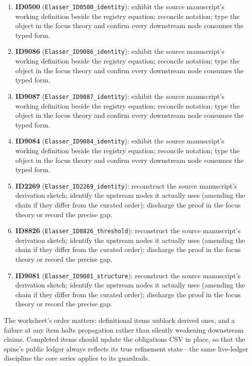 \documentclass[11pt]{article}
\theoremstyle{remark}
\begin{document}
\begin{enumerate}
\item \textbf{ID0500} (\texttt{Elasser\_ID0500\_identity}): exhibit the source manuscript's working definition beside the registry equation; reconcile notation; type the object in the focus theory and confirm every downstream node consumes the typed form.
\item \textbf{ID9086} (\texttt{Elasser\_ID9086\_identity}): exhibit the source manuscript's working definition beside the registry equation; reconcile notation; type the object in the focus theory and confirm every downstream node consumes the typed form.
\item \textbf{ID9087} (\texttt{Elasser\_ID9087\_identity}): exhibit the source manuscript's working definition beside the registry equation; reconcile notation; type the object in the focus theory and confirm every downstream node consumes the typed form.
\item \textbf{ID9084} (\texttt{Elasser\_ID9084\_identity}): exhibit the source manuscript's working definition beside the registry equation; reconcile notation; type the object in the focus theory and confirm every downstream node consumes the typed form.
\item \textbf{ID2269} (\texttt{Elasser\_ID2269\_identity}): reconstruct the source manuscript's derivation sketch; identify the upstream nodes it actually uses (amending the chain if they differ from the curated order); discharge the proof in the focus theory or record the precise gap.
\item \textbf{ID8826} (\texttt{Elasser\_ID8826\_threshold}): reconstruct the source manuscript's derivation sketch; identify the upstream nodes it actually uses (amending the chain if they differ from the curated order); discharge the proof in the focus theory or record the precise gap.
\item \textbf{ID9081} (\texttt{Elasser\_ID9081\_structure}): reconstruct the source manuscript's derivation sketch; identify the upstream nodes it actually uses (amending the chain if they differ from the curated order); discharge the proof in the focus theory or record the precise gap.
\end{enumerate}

The worksheet's order matters: definitional items unblock derived ones, and a failure at any item halts propagation rather than silently weakening downstream claims. Completed items should update the obligations CSV in place, so that the spine's public ledger always reflects its true refinement state---the same live-ledger discipline the core series applies to its guardrails.
\end{document}
